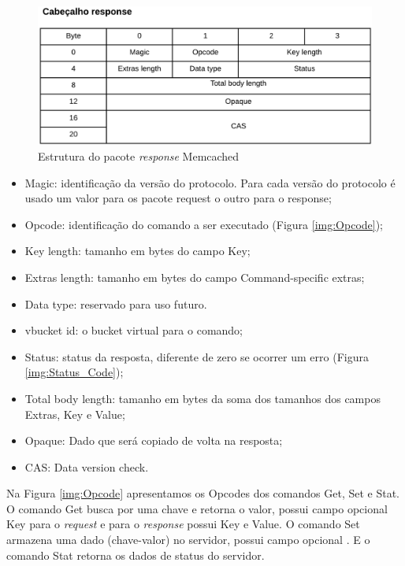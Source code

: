\begin{figure}[H]
     \centering
     \includegraphics[scale=0.6]{img/Memcached_response_header.pdf}
     \caption{Estrutura do pacote \textit{response} Memcached }
     \label{img:Estrtutura response}
\end{figure}

\begin{itemize}
\item Magic: identificação da versão do protocolo. Para cada versão do protocolo é usado um valor para os pacote request o outro para o response;
\item Opcode: identificação do comando a ser executado (Figura \ref{img:Opcode});
\item Key length: tamanho em bytes do campo Key;
\item Extras length: tamanho em bytes do campo Command-specific extras; 
\item Data type: reservado para uso futuro.
\item vbucket id: o bucket virtual para o comando;
\item Status: status da resposta, diferente de zero se ocorrer um erro (Figura \ref{img:Status_Code});
\item Total body length: tamanho em bytes da soma dos tamanhos dos campos Extras, Key e Value;
\item Opaque: Dado que será copiado de volta na resposta;
\item CAS: Data version check.
\end{itemize}

Na Figura \ref{img:Opcode} apresentamos os Opcodes dos comandos Get, Set e Stat. O comando Get busca por uma chave e retorna o valor, possui campo opcional Key para o \textit{request} e para o \textit{response} possui Key e Value. O comando Set armazena uma dado (chave-valor) no servidor, possui campo opcional . E o comando Stat retorna os dados de status do servidor.

